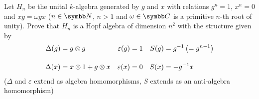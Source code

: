 \begin{exercise}
Let \(H_n\) be the unital \(k\)-algebra generated by \(g\) and \(x\) with relations \(g^n = 1\), \(x^n = 0\) and \(xg = \omega gx\) (\(n \in \naturals\), \(n > 1\) and \(\omega \in \complex\) is a primitive \(n\)-th root of unity). Prove that \(H_n\) is a Hopf algebra of dimension \(n^2\) with the structure given by
\begin{align*}
    \Delta(g) &= g \otimes g  & \varepsilon(g) &= 1 & S(g) &= g^{-1} \left(= g^{n-1}\right) \\[1em]
    \Delta(x) &= x \otimes 1 + g \otimes x & \varepsilon(x) &= 0 & S(x) &= - g^{-1} x
\end{align*}
(\(\Delta\) and \(\varepsilon\) extend as algebra homomorphisms, \(S\) extends as an anti-algebra homomorphism)
\end{exercise}
